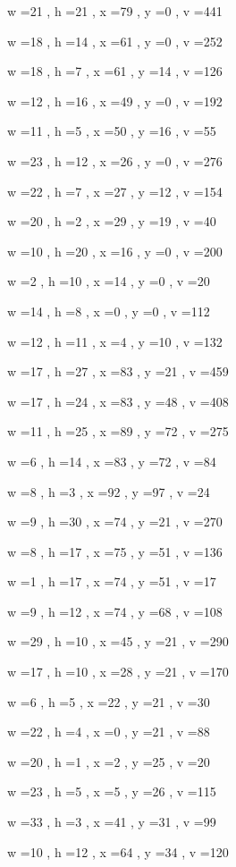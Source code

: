 \documentclass[11pt]{article}
\begin{document}
w =21 , h =21 , x =79 , y =0 , v =441
\par
w =18 , h =14 , x =61 , y =0 , v =252
\par
w =18 , h =7 , x =61 , y =14 , v =126
\par
w =12 , h =16 , x =49 , y =0 , v =192
\par
w =11 , h =5 , x =50 , y =16 , v =55
\par
w =23 , h =12 , x =26 , y =0 , v =276
\par
w =22 , h =7 , x =27 , y =12 , v =154
\par
w =20 , h =2 , x =29 , y =19 , v =40
\par
w =10 , h =20 , x =16 , y =0 , v =200
\par
w =2 , h =10 , x =14 , y =0 , v =20
\par
w =14 , h =8 , x =0 , y =0 , v =112
\par
w =12 , h =11 , x =4 , y =10 , v =132
\par
w =17 , h =27 , x =83 , y =21 , v =459
\par
w =17 , h =24 , x =83 , y =48 , v =408
\par
w =11 , h =25 , x =89 , y =72 , v =275
\par
w =6 , h =14 , x =83 , y =72 , v =84
\par
w =8 , h =3 , x =92 , y =97 , v =24
\par
w =9 , h =30 , x =74 , y =21 , v =270
\par
w =8 , h =17 , x =75 , y =51 , v =136
\par
w =1 , h =17 , x =74 , y =51 , v =17
\par
w =9 , h =12 , x =74 , y =68 , v =108
\par
w =29 , h =10 , x =45 , y =21 , v =290
\par
w =17 , h =10 , x =28 , y =21 , v =170
\par
w =6 , h =5 , x =22 , y =21 , v =30
\par
w =22 , h =4 , x =0 , y =21 , v =88
\par
w =20 , h =1 , x =2 , y =25 , v =20
\par
w =23 , h =5 , x =5 , y =26 , v =115
\par
w =33 , h =3 , x =41 , y =31 , v =99
\par
w =10 , h =12 , x =64 , y =34 , v =120
\par
\newpage
\end{document}
